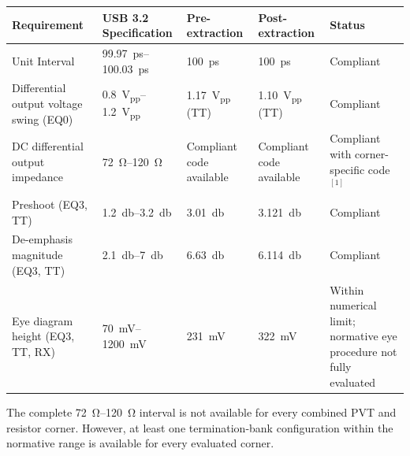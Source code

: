 \begin{threeparttable}
\centering
\small
\caption{Summary of the evaluated USB 3.2 Gen 2 transmitter electrical requirements, pre- versus post-extraction}
\label{tab:usb32_compliance}

\begin{tabular}{p{3.2cm}p{2.8cm}p{2.3cm}p{2.3cm}p{2.8cm}}
\hline \hline

\textbf{Requirement} &
\textbf{\ac{USB} 3.2 Specification} &
\textbf{Pre-extraction} &
\textbf{Post-extraction} &
\textbf{Status} \\

\hline

Unit Interval &
\SIrange{99.97}{100.03}{\pico\second} &
\SI{100}{\pico\second} &
\SI{100}{\pico\second} &
Compliant \\

\hline

Differential output voltage swing (EQ0) &
\SIrange{0.8}{1.2}{\volt_{pp}} &
\SI{1.17}{\volt_{pp}} (\ac{TT}) &
\SI{1.10}{\volt_{pp}} (\ac{TT}) &
Compliant \\

\hline

\ac{DC} differential output impedance &
\SIrange{72}{120}{\ohm} &
Compliant code available &
Compliant code available &
Compliant with corner-specific code$^{[1]}$ \\

\hline

Preshoot (EQ3, \ac{TT}) &
\SIrange{1.2}{3.2}{\decibel} &
\SI{3.01}{\decibel} &
\SI{3.121}{\decibel} &
Compliant \\

\hline

De-emphasis magnitude (EQ3, \ac{TT}) &
\SIrange{2.1}{7}{\decibel} &
\SI{6.63}{\decibel} &
\SI{6.114}{\decibel} &
Compliant \\

\hline

Eye diagram height (EQ3, \ac{TT}, \ac{RX}) &
\SIrange{70}{1200}{\milli\volt} &
\SI{231}{\milli\volt} &
\SI{322}{\milli\volt} &
Within numerical limit; normative eye procedure not fully evaluated \\

\hline \hline
\end{tabular}

\begin{tablenotes}

\item[1] \footnotesize{The complete \SIrange{72}{120}{\ohm} interval is not
available for every combined \ac{PVT} and resistor corner. However, at least one
termination-bank configuration within the normative range is available for every
evaluated corner.}
\end{tablenotes}
\end{threeparttable}


